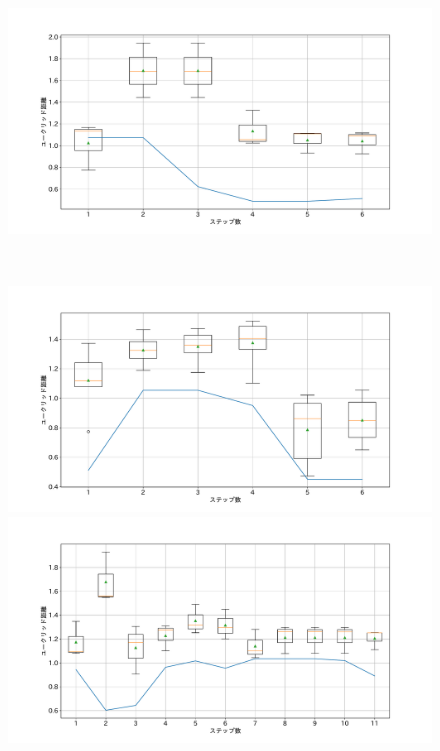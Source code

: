 \begin{figure}[h]
\begin{minipage}[b]{0.48\linewidth}
 \end{minipage}
 \begin{minipage}[b]{0.48\linewidth}
  \centering
  \includegraphics[scale=0.15]{./imgs/gaChange/cake2_6.pdf}
 \end{minipage}\\
 \begin{minipage}[b]{0.48\linewidth}
  \centering
  \includegraphics[scale=0.15]{./imgs/gaChange/cake1_7.pdf}
 \end{minipage}
 \begin{minipage}[b]{0.48\linewidth}
  \centering
  \includegraphics[scale=0.15]{./imgs/gaChange/cake2_7.pdf}

\end{minipage}
\end{figure}
